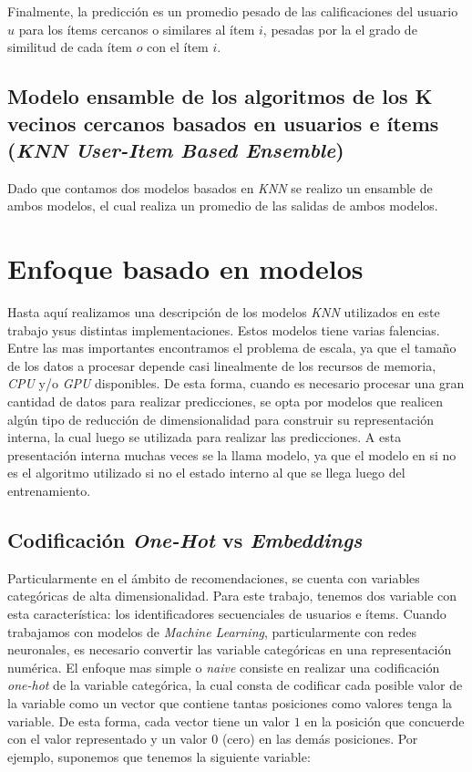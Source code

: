 \documentclass[11pt,a4paper,twoside]{thesis}
\begin{document}
Finalmente, la predicción es un promedio pesado de las calificaciones del
usuario $u$ para los ítems cercanos o similares al ítem $i$, pesadas por la el
grado de similitud de cada ítem $o$ con el ítem $i$.

\subsection{Modelo ensamble de los algoritmos de los K vecinos cercanos basados
	en usuarios e ítems (\textit{KNN User-Item Based Ensemble})}

Dado que contamos dos modelos basados en \textit{KNN} se realizo un ensamble de
ambos modelos, el cual realiza un promedio de las salidas de ambos modelos.

\section{Enfoque basado en modelos}

Hasta aquí realizamos una descripción de los modelos \textit{KNN} utilizados en
este trabajo ysus distintas implementaciones. Estos modelos tiene varias
falencias. Entre las mas importantes encontramos el problema de escala, ya que
el tamaño de los datos a procesar depende casi linealmente de los recursos de
memoria, \textit{CPU} y/o \textit{GPU} disponibles. De esta forma, cuando es
necesario procesar una gran cantidad de datos para realizar predicciones, se
opta por modelos que realicen algún tipo de reducción de dimensionalidad para
construir su representación interna, la cual luego se utilizada para realizar
las predicciones. A esta presentación interna muchas veces se la llama modelo,
ya que el modelo en si no es el algoritmo utilizado si no el estado interno al
que se llega luego del entrenamiento.

\subsection{Codificación \textit{One-Hot} vs \textit{Embeddings}}

Particularmente en el ámbito de recomendaciones, se cuenta con variables
categóricas de alta dimensionalidad. Para este trabajo, tenemos dos variable
con esta característica: los identificadores secuenciales de usuarios e ítems.
Cuando trabajamos con modelos de \textit{Machine Learning}, particularmente con
redes neuronales, es necesario convertir las variable categóricas en una
representación numérica. El enfoque mas simple o \textit{naive} consiste en
realizar una codificación \textit{one-hot} de la variable categórica, la cual
consta de codificar cada posible valor de la variable como un vector que
contiene tantas posiciones como valores tenga la variable. De esta forma, cada
vector tiene un valor $1$ en la posición que concuerde con el valor
representado y un valor $0$ (cero) en las demás posiciones. Por ejemplo,
suponemos que tenemos la siguiente variable:
\end{document}
